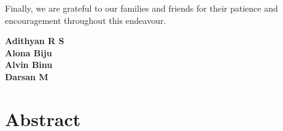 \documentclass[12pt,a4paper]{report}
\begin{document}
Finally, we are grateful to our families and friends for their patience and encouragement throughout this endeavour.

\vspace{1cm}
\begin{flushright}\textbf{Adithyan R S}\\ \textbf{Alona Biju}\\ \textbf{Alvin Binu}\\ \textbf{Darsan M}\end{flushright}

\chapter*{\centering Abstract}


\tableofcontents
\clearpage
{}
\listoffigures
{}
\listoftables
\clearpage

\setcounter{page}{1}











\end{document}
